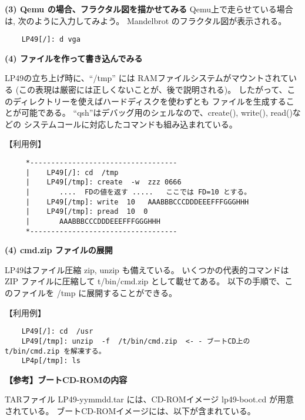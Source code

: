 {\bf (3) Qemu の場合、フラクタル図を描かせてみる}
        Qemu上で走らせている場合は, 次のように入力してみよう。
        Mandelbrot のフラクタル図が表示される。
\begin{verbatim}
    LP49[/]: d vga 
\end{verbatim}

{\bf (4) ファイルを作って書き込んでみる}

     LP49の立ち上げ時に、``/tmp'' には RAMファイルシステムがマウントされている
     (この表現は厳密には正しくないことが、後で説明される)。
    したがって、このディレクトリーを使えばハードディスクを使わずとも
    ファイルを生成することが可能である。
    ``qsh''はデバッグ用のシェルなので、create(), write(), read()などの 
    システムコールに対応したコマンドも組み込まれている。

【利用例】\\
\begin{verbatim}
     *-----------------------------------
     |    LP49[/]: cd  /tmp                                     
     |    LP49[/tmp]: create  -w  zzz 0666                       
     |       ....  FDの値を返す .....   ここでは FD=10 とする。 
     |    LP49[/tmp]: write  10   AAABBBCCCDDDEEEFFFGGGHHH      
     |    LP49[/tmp]: pread  10  0                              
     |       AAABBBCCCDDDEEEFFFGGGHHH                           
     *-----------------------------------
\end{verbatim}
           
{\bf (4) cmd.zip ファイルの展開}

    LP49はファイル圧縮 zip, unzip も備えている。
    いくつかの代表的コマンドは ZIP ファイルに圧縮して t/bin/cmd.zip として載せてある。
    以下の手順で、このファイルを /tmp に展開することができる。

【利用例】\\
\begin{verbatim}
    LP49[/]: cd  /usr  
    LP49[/tmp]: unzip  -f  /t/bin/cmd.zip  <- - ブートCD上の t/bin/cmd.zip を解凍する。
    LP4p[/tmp]: ls   
\end{verbatim}


{\bf\flushleft 【参考】ブートCD-ROMの内容}

    TARファイル LP49-yymmdd.tar には、CD-ROMイメージ lp49-boot.cd が用意されている。
    ブートCD-ROMイメージには、以下が含まれている。

